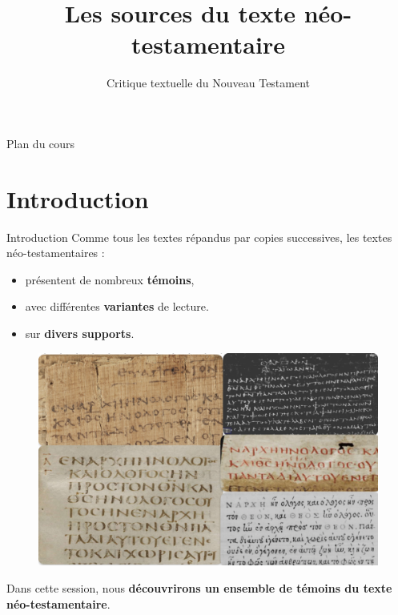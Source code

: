 \documentclass[11pt]{beamer}
\begin{document}
\title{Les sources du texte néo-testamentaire}
\subtitle{Critique textuelle du Nouveau Testament}

\begin{frame}{}
    \titlepage
\end{frame}

\begin{frame}{Plan du cours}
\tableofcontents
\end{frame}

\section{Introduction}

\begin{frame}{Introduction}
    Comme tous les textes répandus par copies successives, les textes néo-testamentaires :
    \begin{itemize}
        \item présentent de nombreux \textbf{témoins},
        \item avec différentes \textbf{variantes} de lecture.
        \item sur \textbf{divers supports}.
    \end{itemize}
     \pause
     \begin{figure}
         \centering
         \includegraphics[width=0.5\linewidth]{img/divers_jn_1_1.png}
     \end{figure}
    \vfill
    \begin{block}{}
        Dans cette session, nous \textbf{découvrirons un ensemble de témoins du texte néo-testamentaire}.
    \end{block}
\end{frame}
\end{document}
